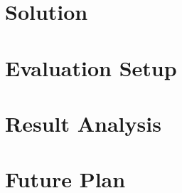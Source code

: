 \documentclass[sigconf]{acmart}
\begin{document}
\section{Solution}


\section{Evaluation Setup}


\section{Result Analysis}


\section{Future Plan}




\end{document}
